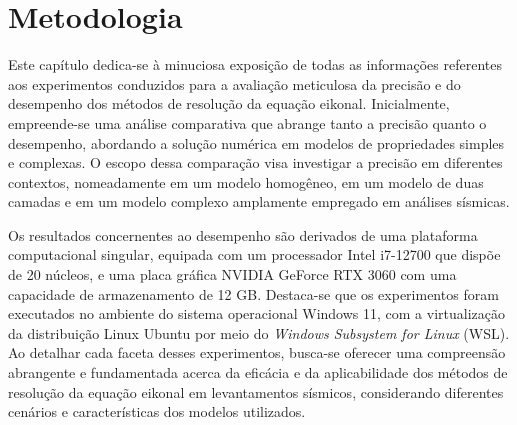 \chapter{Metodologia}
\label{ch:metodologia}

Este capítulo dedica-se à minuciosa exposição de todas as informações referentes aos experimentos conduzidos para a avaliação meticulosa da precisão e do desempenho dos métodos de resolução da equação eikonal. Inicialmente, empreende-se uma análise comparativa que abrange tanto a precisão quanto o desempenho, abordando a solução numérica em modelos de propriedades simples e complexas. O escopo dessa comparação visa investigar a precisão em diferentes contextos, nomeadamente em um modelo homogêneo, em um modelo de duas camadas e em um modelo complexo amplamente empregado em análises sísmicas.

Os resultados concernentes ao desempenho são derivados de uma plataforma computacional singular, equipada com um processador Intel i7-12700 que dispõe de 20 núcleos, e uma placa gráfica NVIDIA GeForce RTX 3060 com uma capacidade de armazenamento de 12 GB. Destaca-se que os experimentos foram executados no ambiente do sistema operacional Windows 11, com a virtualização da distribuição Linux Ubuntu por meio do \textit{Windows Subsystem for Linux} (WSL). Ao detalhar cada faceta desses experimentos, busca-se oferecer uma compreensão abrangente e fundamentada acerca da eficácia e da aplicabilidade dos métodos de resolução da equação eikonal em levantamentos sísmicos, considerando diferentes cenários e características dos modelos utilizados.


